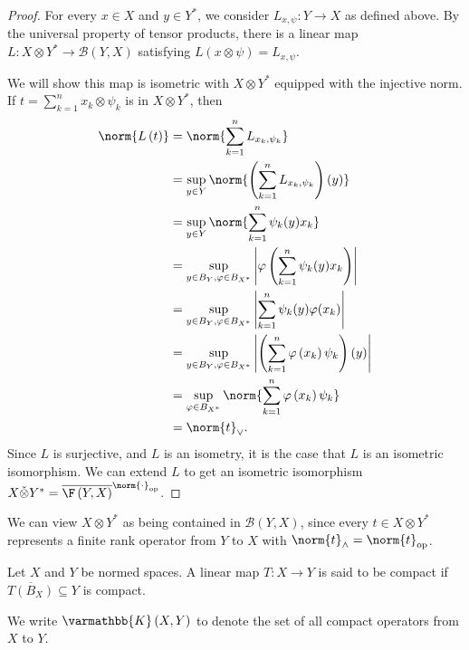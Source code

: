\documentclass[10pt]{mypackage}
\renewcommand*{\mathbb}[1]{\varmathbb{#1}}
\newcommand{\K}{\mathbb{K}}
\begin{document}
\begin{proof}
  For every $x\in X$ and $y\in Y^{\ast}$, we consider $L_{x,\psi}: Y\rightarrow X$ as defined above. By the universal property of tensor products, there is a linear map $L: X\otimes Y^{\ast}\rightarrow \mathcal{B}\left(Y,X\right)$ satisfying $L\left(x\otimes \psi\right) = L_{x,\psi}$.\newline

  We will show this map is isometric with $X\otimes Y^{\ast}$ equipped with the injective norm. If $t = \sum_{k=1}^{n}x_k\otimes \psi_k$ is in $X\otimes Y^{\ast}$, then
  \begin{align*}
    \norm{L\left(t\right)} &= \norm{\sum_{k=1}^{n}L_{x_k,\psi_k}}\\
                           &= \sup_{y\in Y}\norm{\left(\sum_{k=1}^{n}L_{x_k,\psi_k}\right)\left(y\right)}\\
                           &= \sup_{y\in Y}\norm{\sum_{k=1}^{n}\psi_k(y)x_k}\\
                           &= \sup_{y\in B_Y,\varphi\in B_{X^{\ast}}}\left\vert \varphi\left(\sum_{k=1}^{n}\psi_k(y)x_k\right) \right\vert\\
                           &= \sup_{y\in B_Y,\varphi\in B_{X^{\ast}}}\left\vert \sum_{k=1}^{n}\psi_k(y)\varphi(x_k) \right\vert\\
                           &= \sup_{y\in B_Y,\varphi\in B_{X^{\ast}}}\left\vert \left(\sum_{k=1}^{n}\varphi\left(x_k\right)\psi_k\right)(y) \right\vert\\
                           &= \sup_{\varphi\in B_{X^{\ast}}}\norm{\sum_{k=1}^{n}\varphi\left(x_k\right)\psi_k}\\
                           &= \norm{t}_{\vee}.
  \end{align*}
  Since $L$ is surjective, and $L$ is an isometry, it is the case that $L$ is an isometric isomorphism. We can extend $L$ to get an isometric isomorphism $X\check\otimes Y^{\ast} = \overline{\F\left(Y,X\right)}^{\norm{\cdot}_{\text{op}}}$.
\end{proof}
\begin{remark}
  We can view $X\otimes Y^{\ast}$ as being contained in $\mathcal{B}\left(Y,X\right)$, since every $t\in X\otimes Y^{\ast}$ represents a finite rank operator from $Y$ to $X$ with $\norm{t}_{\wedge} = \norm{t}_{\text{op}}$.
\end{remark}
\begin{definition}
  Let $X$ and $Y$ be normed spaces. A linear map $T: X\rightarrow Y$ is said to be compact if $\overline{T\left(B_X\right)}\subseteq Y$ is compact.\newline

  We write $\K\left(X,Y\right)$ to denote the set of all compact operators from $X$ to $Y$.
\end{definition}
\end{document}
